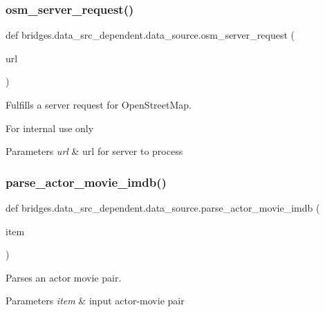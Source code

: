 \subsubsection{\texorpdfstring{osm\+\_\+server\+\_\+request()}{osm\_server\_request()}}
{\footnotesize\ttfamily def bridges.\+data\+\_\+src\+\_\+dependent.\+data\+\_\+source.\+osm\+\_\+server\+\_\+request (\begin{DoxyParamCaption}\item[{}]{url }\end{DoxyParamCaption})}



Fulfills a server request for Open\+Street\+Map. 

For internal use only


\begin{DoxyParams}{Parameters}
{\em url} & url for server to process \\
\hline
\end{DoxyParams}
\mbox{\label{namespacebridges_1_1data__src__dependent_1_1data__source_adcd1eb0d5e4c80095232e808f34469ad}} 
\subsubsection{\texorpdfstring{parse\+\_\+actor\+\_\+movie\+\_\+imdb()}{parse\_actor\_movie\_imdb()}}
{\footnotesize\ttfamily def bridges.\+data\+\_\+src\+\_\+dependent.\+data\+\_\+source.\+parse\+\_\+actor\+\_\+movie\+\_\+imdb (\begin{DoxyParamCaption}\item[{}]{item }\end{DoxyParamCaption})}



Parses an actor movie pair. 


\begin{DoxyParams}{Parameters}
{\em item} & input actor-\/movie pair \\
\hline
\end{DoxyParams}
